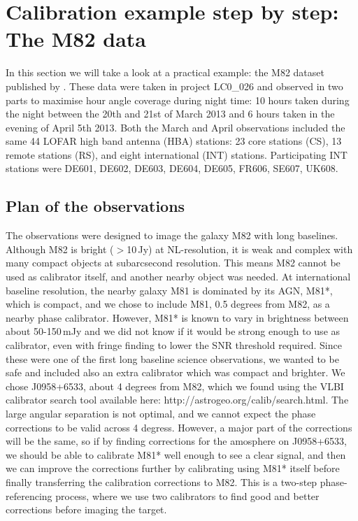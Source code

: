 \section{Calibration example step by step: The M82 data}
\label{sect:handson}
In this section we will take a look at a practical example: the M82 dataset
published by \cite{varenius2014}. 
These data were taken in project LC0\_026 and observed in two parts to maximise
hour angle coverage during night time: 10 hours taken during the night between
the 20th and 21st of March 2013 and 6 hours taken in the evening of April 5th
2013.  Both the March and April observations included the same 44 LOFAR high
band antenna (HBA) stations: 23 core stations (CS), 13 remote stations (RS),
and eight international (INT) stations. Participating INT stations were DE601,
DE602, DE603, DE604, DE605, FR606, SE607, UK608.

\subsection{Plan of the observations}
The observations were designed to image the galaxy M82 with long baselines.
Although M82 is bright ($>$10\,Jy) at NL-resolution, it is weak and complex
with many compact objects at subarcsecond resolution. This means M82
cannot be used as calibrator itself, and another nearby object was needed.
At international baseline resolution, the nearby galaxy M81 is dominated by 
its AGN, M81*, which is compact, and we chose to include M81, 
0.5 degrees from M82, as a nearby phase calibrator. However,
M81* is known to vary in brightness between about 50-150\,mJy
and we did not know if it would be strong enough to use as calibrator,
even with fringe finding to lower the SNR threshold required. Since
these were one of the first long baseline science observations, we
wanted to be safe and included also an extra calibrator which was compact and
brighter. We chose J0958+6533, about 4 degrees from M82, which we found using the
VLBI calibrator search tool available here: http://astrogeo.org/calib/search.html.
The large angular separation is not optimal, and we cannot expect the phase
corrections to be valid across 4 degress. However, a major part of the
corrections will be the same, so if by finding corrections for the amosphere on
J0958+6533, we should be able to calibrate M81* well enough to see a clear
signal, and then we can improve the corrections further by calibrating using
M81* itself before finally transferring the calibration corrections to M82.
This is a two-step phase-referencing process, where we use two calibrators to
find good and better corrections before imaging the target. 


